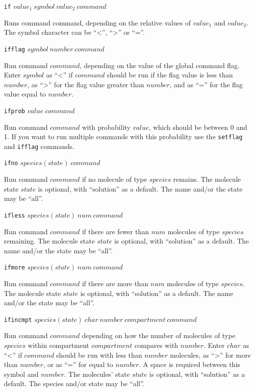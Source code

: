 \documentclass {book}
\newcommand {\ttt} {\texttt}
\begin{document}
\begin{description}

\item{\ttt{if} $value_1\ symbol\ value_2\ command$}

Runs command command, depending on the relative values of $value_1$ and $value_2$. The symbol character can be ``<'', ``>'' or ``=''.

\item{\ttt{ifflag} $symbol\ number\ command$}

Run command $command$, depending on the value of the global command flag. Enter $symbol$ as ``<'' if $command$ should be run if the flag value is less than $number$, as ``>'' for the flag value greater than $number$, and as ``='' for the flag value equal to $number$.

\item{\ttt{ifprob} $value\ command$}

Run command $command$ with probability $value$, which should be between 0 and 1. If you want to run multiple commands with this probability use the \ttt{setflag} and \ttt{ifflag} commands.

\item{\ttt{ifno} $species(state)\ command$}

Run command $command$ if no molecule of type $species$ remains. The molecule state $state$ is optional, with ``solution'' as a default. The name and/or the state may be ``all''.

\item{\ttt{ifless} $species(state)\ num\ command$}

Run command $command$ if there are fewer than $num$ molecules of type $species$ remaining. The molecule state $state$ is optional, with ``solution'' as a default. The name and/or the state may be ``all''.

\item{\ttt{ifmore} $species(state)\ num\ command$}

Run command $command$ if there are more than $num$ molecules of type $species$. The molecule state $state$ is optional, with ``solution'' as a default. The name and/or the state may be ``all''.

\item{\ttt{ifincmpt} $species(state)\ char\ number\ compartment\ command$}

Run command $command$ depending on how the number of molecules of type $species$ within compartment $compartment$ compares with $number$. Enter $char$ as ``<'' if $command$ should be run with less than $number$ molecules, as ``>'' for more than $number$, or as ``='' for equal to $number$. A space is required between this symbol and $number$. The molecules' state $state$ is optional, with ``solution'' as a default. The species and/or state may be ``all''.


\end{description}
\end{document}
